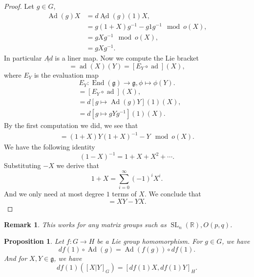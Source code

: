 \documentclass{article}
\newtheorem{proposition}{Proposition}[section]
\newtheorem{remark}{Remark}[section]
\numberwithin{equation}{section}
\DeclareMathOperator{\Ad}{Ad}
\DeclareMathOperator{\ad}{ad}
\DeclareMathOperator{\End}{End}
\DeclareMathOperator{\SL}{SL}
\begin{document}
\begin{proof} Let $g\in G$, 
\begin{align*}
\Ad(g)X &= d\underline{\Ad}(g)(1)X,\\
& = g(1+X)g^{-1}-g1g^{-1}\mod{o(X)},\\
& = gXg^{-1}\mod{o(X)},\\
&=gXg^{-1}.
\end{align*}
In particular $\underline{Ad}$ is a liner map. Now we compute the Lie bracket
\begin{equation*}
[X|Y] = \ad(X)(Y) = [E_Y\circ\ad](X),
\end{equation*}
where $E_Y$ is the evaluation map 
\begin{equation*}
E_Y:\End(\mathfrak{g})\to\mathfrak{g}, \phi\mapsto\phi(Y).
\end{equation*}
\begin{align*}
[X|Y] & = [E_Y\circ\ad](X),\\
& = d[g\mapsto\Ad(g)Y](1)(X),\\
&=d[g\mapsto gYg^{-1}](1)(X).
\end{align*}
By the first computation we did, we see that
\begin{align*}
[X|Y] = (1+X)Y(1+X)^{-1}-Y\mod{o(X)}.
\end{align*}
We have the following identity
\begin{equation*}
(1-X)^{-1}=1+X+X^2+\cdots.
\end{equation*}
Substituting $-X$ we derive that
\begin{equation*}
1+X=\sum_{i=0}^\infty (-1)^iX^i.
\end{equation*}
And we only need at most degree $1$ terms of $X$. We conclude that
\begin{equation*}
[X|Y] =XY-YX.
\end{equation*}
\end{proof}

\begin{remark}
This works for any matrix groups such as $\SL_n(\mathbb{R}),O(p,q)$.
\end{remark}

\begin{proposition}
Let $f:G\to H$ be a Lie group homomorphism. For $g\in G$, we have
\begin{equation}
df(1)\circ\Ad(g)=\Ad(f(g))\circ df(1).
\label{nat_transform_gh}
\end{equation}
And for $X,Y\in\mathfrak{g}$, we have
\begin{equation}
df(1)([X|Y]_G)=[df(1)X,df(1)Y]_H.
\end{equation}
\label{comp_homo}
\end{proposition}
\end{document}
